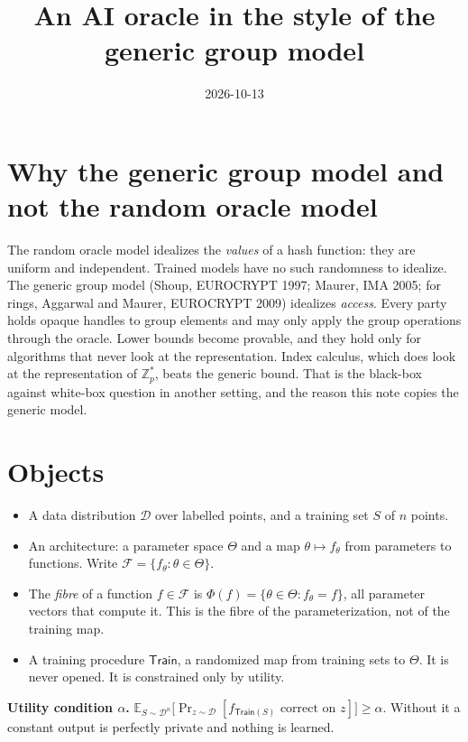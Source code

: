 \documentclass[
]{article}
\title{An AI oracle in the style of the generic group model}
\author{}
\date{2026-10-13}
\providecommand{\tightlist}{%
  \setlength{\itemsep}{0pt}\setlength{\parskip}{0pt}}
\begin{document}
\maketitle

\section{Why the generic group model and not the random oracle
model}\label{why-the-generic-group-model-and-not-the-random-oracle-model}

The random oracle model idealizes the \emph{values} of a hash function:
they are uniform and independent. Trained models have no such randomness
to idealize. The generic group model (Shoup, EUROCRYPT 1997; Maurer, IMA
2005; for rings, Aggarwal and Maurer, EUROCRYPT 2009) idealizes
\emph{access}. Every party holds opaque handles to group elements and
may only apply the group operations through the oracle. Lower bounds
become provable, and they hold only for algorithms that never look at
the representation. Index calculus, which does look at the
representation of \(\mathbb{Z}_p^*\), beats the generic bound. That is
the black-box against white-box question in another setting, and the
reason this note copies the generic model.

\section{Objects}\label{objects}

\begin{itemize}
\tightlist
\item
  A data distribution \(\mathcal{D}\) over labelled points, and a
  training set \(S\) of \(n\) points.
\item
  An architecture: a parameter space \(\Theta\) and a map
  \(\theta \mapsto f_\theta\) from parameters to functions. Write
  \(\mathcal{F} = \{ f_\theta : \theta \in \Theta \}\).
\item
  The \emph{fibre} of a function \(f \in \mathcal{F}\) is
  \(\Phi(f) = \{ \theta \in \Theta : f_\theta = f \}\), all parameter
  vectors that compute it. This is the fibre of the parameterization,
  not of the training map.
\item
  A training procedure \(\mathsf{Train}\), a randomized map from
  training sets to \(\Theta\). It is never opened. It is constrained
  only by utility.
\end{itemize}

\textbf{Utility condition \(\alpha\).}
\(\mathbb{E}_{S \sim \mathcal{D}^n}\big[\Pr_{z \sim \mathcal{D}}[f_{\mathsf{Train}(S)} \text{ correct on } z]\big] \ge \alpha\).
Without it a constant output is perfectly private and nothing is
learned.
\end{document}
